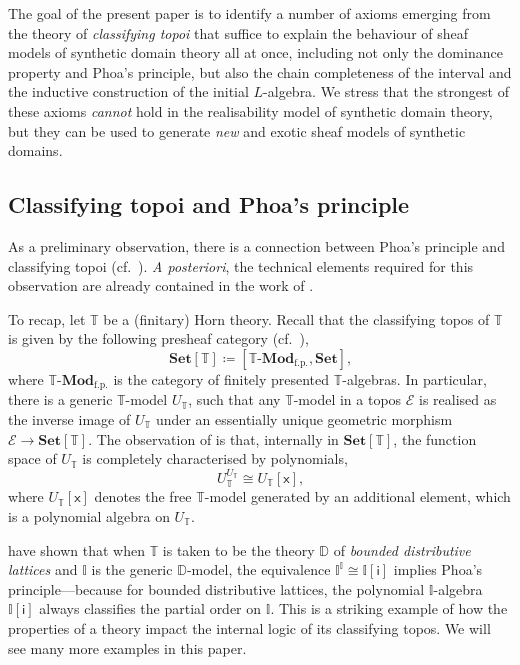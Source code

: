 \documentclass[a4paper,12pt]{amsart}
\theoremstyle{definition}
\newcommand{\mc}[1]{\mathcal{#1}}
\newcommand{\mb}[1]{\mathbf{#1}}
\newcommand{\mbb}[1]{\mathbb{#1}}
\newcommand{\T}{\mbb T}
\newcommand{\I}{\mbb I}
\newcommand{\mr}[1]{\mathrm{#1}}
\newcommand{\ms}[1]{\mathsf{#1}}
\newcommand{\Set}{\mb{Set}}
\newcommand{\fp}{_{\mr{f.p.}}}
\newcommand{\mmod}[1]{#1\text{-}\mathbf{Mod}}
\begin{document}
The goal of the present paper is to identify a number of axioms emerging from the theory of \emph{classifying topoi} that suffice to explain the behaviour of sheaf models of synthetic domain theory all at once, including not only the dominance property and Phoa's principle, but also the chain completeness of the interval and the inductive construction of the initial $L$-algebra. We stress that the strongest of these axioms \emph{cannot} hold in the realisability model of synthetic domain theory, but they can be used to generate \emph{new} and exotic sheaf models of synthetic domains.

\subsection{Classifying topoi and Phoa's principle}\label{subsec:classtopphoa}

As a preliminary observation, there is a connection between Phoa's principle and classifying topoi (cf.\ \citet[Lem 3.8]{gratzer2024directed}).
\emph{A posteriori}, the technical elements required for this observation are already contained in the work of \citet{RN879}.

To recap, let $\T$ be a (finitary) Horn theory. Recall that the classifying topos of $\T$ is given by the following presheaf category (cf.\ \citet[D3.1]{johnstone2002sketches}),
\[ \Set[\T] \coloneq [\mmod\T\fp,\Set]\text{,} \]
where $\mmod\T\fp$ is the category of finitely presented $\T$-algebras. In particular, there is a generic $\T$-model $U_\T$, such that any $\T$-model in a topos $\mc E$ is realised as the inverse image of $U_\T$ under an essentially unique geometric morphism $\mc E \to \Set[\T]$. The observation of \citet{RN879} is that, internally in $\Set[\T]$, the function space of $U_\T$ is completely characterised by polynomials,
\[ U_\T^{U_\T} \cong U_\T[\ms{x}]\text{,} \]
where $U_\T[\ms{x}]$ denotes the free $\T$-model generated by an additional element, which is a  polynomial algebra on $U_\T$.

\citet{gratzer2024directed} have shown that when $\T$ is taken to be the theory $\mbb D$ of \emph{bounded distributive lattices} and $\I$ is the generic $\mbb D$-model, the equivalence $\I^\I \cong \I[\ms{i}]$ implies Phoa's principle---because for bounded distributive lattices, the polynomial $\I$-algebra $\I[\ms{i}]$ always classifies the partial order on $\I$. This is a striking example of how the properties of a theory impact the internal logic of its classifying topos. We will see many more examples in this paper.
\end{document}
